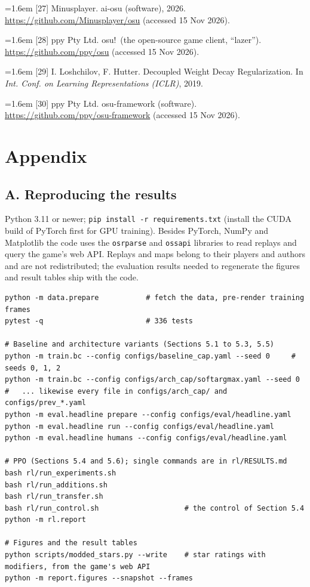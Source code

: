 \documentclass[10pt,a4paper]{article}
\begin{document}
{\hangindent=1.6em [27] Minusplayer. ai-osu (software), 2026. \url{https://github.com/Minusplayer/osu} (accessed 15 Nov 2026).\par}

{\hangindent=1.6em [28] ppy Pty Ltd. osu!\ (the open-source game client, ``lazer''). \url{https://github.com/ppy/osu} (accessed 15 Nov 2026).\par}

{\hangindent=1.6em [29] I. Loshchilov, F. Hutter. Decoupled Weight Decay Regularization. In \textit{Int. Conf. on Learning Representations (ICLR)}, 2019.\par}

{\hangindent=1.6em [30] ppy Pty Ltd. osu-framework (software). \url{https://github.com/ppy/osu-framework} (accessed 15 Nov 2026).\par}

\newpage{}

\section*{Appendix}

\subsection*{A. Reproducing the results}

Python 3.11 or newer; {\small\texttt{pip install -r requirements.txt}} (install the CUDA build of PyTorch first for GPU training). Besides PyTorch, NumPy and Matplotlib the code uses the {\small\texttt{osrparse}} and {\small\texttt{ossapi}} libraries to read replays and query the game's web API. Replays and maps belong to their players and authors and are not redistributed; the evaluation results needed to regenerate the figures and result tables ship with the code.


{\footnotesize\begin{verbatim}
python -m data.prepare           # fetch the data, pre-render training frames
pytest -q                        # 336 tests

# Baseline and architecture variants (Sections 5.1 to 5.3, 5.5)
python -m train.bc --config configs/baseline_cap.yaml --seed 0     # seeds 0, 1, 2
python -m train.bc --config configs/arch_cap/softargmax.yaml --seed 0
#   ... likewise every file in configs/arch_cap/ and configs/prev_*.yaml
python -m eval.headline prepare --config configs/eval/headline.yaml
python -m eval.headline run --config configs/eval/headline.yaml
python -m eval.headline humans --config configs/eval/headline.yaml

# PPO (Sections 5.4 and 5.6); single commands are in rl/RESULTS.md
bash rl/run_experiments.sh
bash rl/run_additions.sh
bash rl/run_transfer.sh
bash rl/run_control.sh                    # the control of Section 5.4
python -m rl.report

# Figures and the result tables
python scripts/modded_stars.py --write    # star ratings with modifiers, from the game's web API
python -m report.figures --snapshot --frames
\end{verbatim}}
\end{document}
